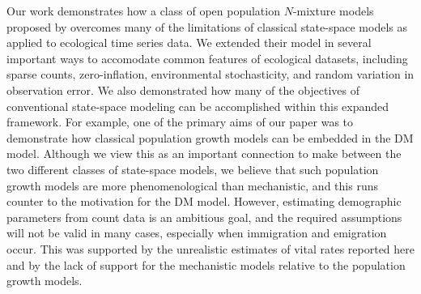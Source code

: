 \documentclass[12pt,english]{article}
\begin{document}
\begin{spacing}{1.9}
\begin{flushleft}
Our work %
demonstrates how a class of open population $N$-mixture models
proposed by \citet{dail_madsen:2011} overcomes 
many of the limitations of classical state-space models as applied to
ecological time series data.
We extended their model in several important
ways to accomodate common features of ecological
datasets, including sparse counts, zero-inflation, environmental
stochasticity, and random variation in observation error.
We also demonstrated how many of the objectives of conventional
state-space modeling can be accomplished within this expanded
framework. For example, one of the primary aims of our paper was to demonstrate how classical
population growth models can be embedded in the DM model.
Although we view this as an important connection to make between the two
different classes of state-space models, we believe that
such population growth models are more phenomenological
than mechanistic, and this runs counter to the motivation for
the DM model. However, estimating
demographic parameters from count data is an ambitious goal, and
the required assumptions will not be valid in many cases,
especially when immigration and emigration occur. This was supported by the
unrealistic estimates of vital rates reported here and by the
lack of support for the mechanistic models relative to the population
growth models.


\end{flushleft}
\end{spacing}
\end{document}
